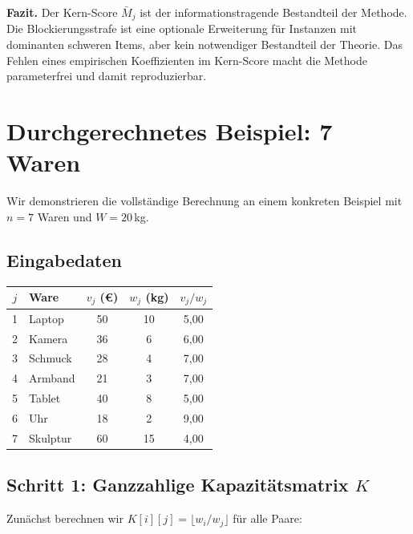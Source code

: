 \documentclass[a4paper,11pt]{article}
\begin{document}
\medskip
\noindent
\textbf{Fazit.}
Der Kern-Score $\bar{M}_j$ ist der informationstragende
Bestandteil der Methode. Die Blockierungsstrafe ist eine
optionale Erweiterung für Instanzen mit dominanten schweren
Items, aber kein notwendiger Bestandteil der Theorie.
Das Fehlen eines empirischen Koeffizienten im Kern-Score
macht die Methode parameterfrei und damit reproduzierbar.

\section{Durchgerechnetes Beispiel: 7 Waren}
\label{sec:beispiel}

Wir demonstrieren die vollständige Berechnung an einem
konkreten Beispiel mit $n=7$ Waren und $W=20$\,kg.

\subsection{Eingabedaten}

\begin{center}
\renewcommand{\arraystretch}{1.2}
\begin{tabular}{clccc}
\toprule
$j$ & Ware & $v_j$ (\euro) & $w_j$ (kg) & $v_j/w_j$ \\
\midrule
1 & Laptop   & 50 & 10 & 5{,}00 \\
2 & Kamera   & 36 &  6 & 6{,}00 \\
3 & Schmuck  & 28 &  4 & 7{,}00 \\
4 & Armband  & 21 &  3 & 7{,}00 \\
5 & Tablet   & 40 &  8 & 5{,}00 \\
6 & Uhr      & 18 &  2 & 9{,}00 \\
7 & Skulptur & 60 & 15 & 4{,}00 \\
\bottomrule
\end{tabular}
\end{center}

\subsection{Schritt 1: Ganzzahlige Kapazitätsmatrix $K$}

Zunächst berechnen wir $K[i][j] = \lfloor w_i / w_j \rfloor$
für alle Paare:
\end{document}
